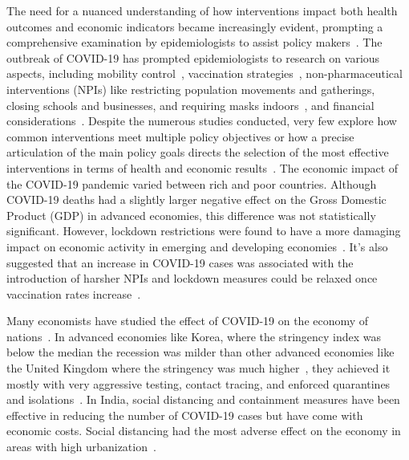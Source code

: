 \documentclass[tikz,fleqn,12pt]{wlscirep}
\begin{document}
The need for a nuanced understanding of how interventions impact both health outcomes and economic indicators became increasingly evident, prompting a comprehensive examination by epidemiologists to assist policy makers~\cite{Anderson2020}. The outbreak of COVID-19 has prompted epidemiologists to research on various aspects, including mobility control~\cite{Song2022,Chinazzi2020}, vaccination strategies~\cite{Nguyen2021, Kim2022}, non-pharmaceutical interventions (NPIs) like restricting population movements and gatherings, closing schools and businesses, and requiring masks indoors~\cite{Jalloh2022,Caldwell2021,Ferguson2020}, and financial considerations~\cite{DeFoo2023}. Despite the numerous studies conducted, very few explore how common interventions meet multiple policy objectives or how a precise articulation of the main policy goals directs the selection of the most effective interventions in terms of health and economic results~\cite{Hollingsworth2011, Song2022,Pangallo2023,Ash2022,Ohi2020, PADMANABHAN2021102676,NBERw26981,analytical_covid_lockdown_model}. The economic impact of the COVID-19 pandemic varied between rich and poor countries. Although COVID-19 deaths had a slightly larger negative effect on the Gross Domestic Product (GDP) in advanced economies, this difference was not statistically significant. However, lockdown restrictions were found to have a more damaging impact on economic activity in emerging and developing economies~\cite{Gagnon2023,Redlin2022,Liang2021}. It's also suggested that an increase in COVID-19 cases was associated with the introduction of harsher NPIs and lockdown measures could be relaxed once vaccination rates increase~\cite{Redlin2022,Patel2021}.

Many economists have studied the effect of COVID-19 on the economy of nations~\cite{Gagnon2023,GagnonKorea,Deb2020,Eichenbaum2021}. In advanced economies like Korea, where the stringency index was below the median the recession was milder than other advanced economies like the United Kingdom where the stringency was much higher~\cite{GagnonKorea}, they achieved it mostly with very aggressive testing, contact tracing, and enforced quarantines and isolations~\cite{Lim2023,KoreaMinister}. In India, social distancing and containment measures have been effective in reducing the number of COVID-19 cases but have come with economic costs. Social distancing had the most adverse effect on the economy in areas with high urbanization~\cite{Deb2020}.
\end{document}
